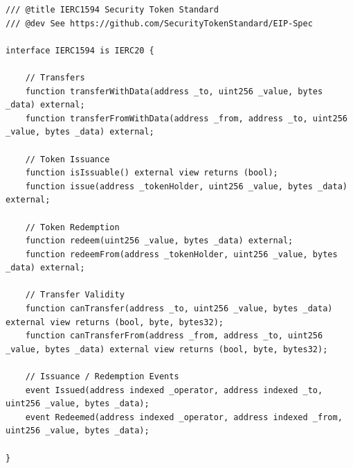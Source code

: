 \begin{lstlisting}[language=Solidity,numbers=none]
/// @title IERC1594 Security Token Standard
/// @dev See https://github.com/SecurityTokenStandard/EIP-Spec

interface IERC1594 is IERC20 {

    // Transfers
    function transferWithData(address _to, uint256 _value, bytes _data) external;
    function transferFromWithData(address _from, address _to, uint256 _value, bytes _data) external;

    // Token Issuance
    function isIssuable() external view returns (bool);
    function issue(address _tokenHolder, uint256 _value, bytes _data) external;

    // Token Redemption
    function redeem(uint256 _value, bytes _data) external;
    function redeemFrom(address _tokenHolder, uint256 _value, bytes _data) external;

    // Transfer Validity
    function canTransfer(address _to, uint256 _value, bytes _data) external view returns (bool, byte, bytes32);
    function canTransferFrom(address _from, address _to, uint256 _value, bytes _data) external view returns (bool, byte, bytes32);

    // Issuance / Redemption Events
    event Issued(address indexed _operator, address indexed _to, uint256 _value, bytes _data);
    event Redeemed(address indexed _operator, address indexed _from, uint256 _value, bytes _data);

}
\end{lstlisting}



